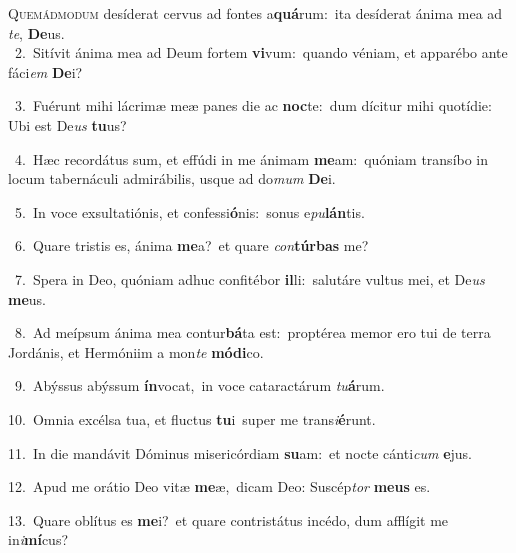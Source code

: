 \lettrine{\initial\textcolor{\initialcolor}{Q}}{uemádmodum} desíderat cervus ad fontes a\-\textbf{quá}\-rum:~\star ita desíderat ánima mea ad \textit{te}\-, \textbf{De}\-us.\\
{\numbfont\textcolor{\numbcolor}{~2.}}~Sitívit ánima mea ad Deum fortem \textbf{vi}\-vum:~\star quando véniam, et apparébo ante fáci\textit{em} \textbf{De}\-i?\par
{\numbfont\textcolor{\numbcolor}{~3.}}~Fuérunt mihi lácrimæ meæ panes die ac \textbf{noc}\-te:~\star dum dícitur mihi quotídie: Ubi est De\textit{us} \textbf{tu}\-us?\par
{\numbfont\textcolor{\numbcolor}{~4.}}~Hæc recordátus sum, et effúdi in me ánimam \textbf{me}\-am:~\star quóniam transíbo in locum tabernáculi admirábilis, usque ad do\textit{mum} \textbf{De}\-i.\par
{\numbfont\textcolor{\numbcolor}{~5.}}~In voce exsultatiónis, et confessi\-\textbf{ó}\-nis:~\star sonus e\-\textit{pu}\-\textbf{lán}tis.\par
{\numbfont\textcolor{\numbcolor}{~6.}}~Quare tristis es, ánima \textbf{me}\-a?~\star et quare \textit{con}\-\textbf{túr}\textbf{bas} me?\par
{\numbfont\textcolor{\numbcolor}{~7.}}~Spera in Deo, quóniam adhuc confitébor \textbf{il}\-li:~\star salutáre vultus mei, et De\textit{us} \textbf{me}\-us.\par
{\numbfont\textcolor{\numbcolor}{~8.}}~Ad meípsum ánima mea contur\-\textbf{bá}\-ta est:~\star proptérea memor ero tui de terra Jordánis, et Hermóniim a mon\textit{te} \textbf{mó}\-\textbf{di}co.\par
{\numbfont\textcolor{\numbcolor}{~9.}}~Abýssus abýssum \textbf{ín}\-vocat,~\star in voce cataractárum \textit{tu}\-\textbf{á}rum.\par
{\numbfont\textcolor{\numbcolor}{10.}}~Omnia excélsa tua, et fluctus \textbf{tu}\-i~\star super me trans\-\textit{i}\-\textbf{é}runt.\par
{\numbfont\textcolor{\numbcolor}{11.}}~In die mandávit Dóminus misericórdiam \textbf{su}\-am:~\star et nocte cánti\textit{cum} \textbf{e}\-jus.\par
{\numbfont\textcolor{\numbcolor}{12.}}~Apud me orátio Deo vitæ \textbf{me}\-æ,~\star dicam Deo: Suscép\textit{tor} \textbf{me}\-\textbf{us} es.\par
{\numbfont\textcolor{\numbcolor}{13.}}~Quare oblítus es \textbf{me}\-i?~\star et quare contristátus incédo, dum afflígit me in\-\textit{i}\-\textbf{mí}cus?\par
